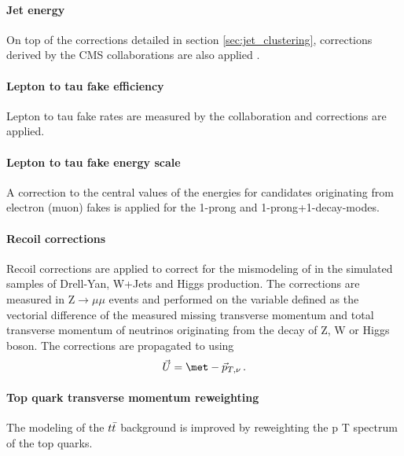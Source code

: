 \paragraph{Jet energy} On top of the corrections detailed in section \ref{sec:jet_clustering}, corrections derived by the CMS collaborations are also applied \cite{collaboration_2011}.

\paragraph{Lepton to tau fake efficiency} Lepton to tau fake rates are measured by the collaboration and corrections are applied.

\paragraph{Lepton to tau fake energy scale} A correction to the central values of the \tauh energies for \tauh candidates originating from electron (muon) fakes is applied for the 1-prong and 1-prong+1-\pizero decay-modes. 

\paragraph{Recoil corrections} Recoil corrections are applied to correct for the mismodeling of \met in the simulated samples of Drell-Yan, W+Jets and Higgs production. The corrections are measured in $\mathrm{Z} \rightarrow \mu\mu$ events and performed on the variable defined as the vectorial difference of the measured missing transverse momentum and total transverse momentum of neutrinos originating from the decay of Z, W or Higgs boson. The corrections are propagated to \met using
\begin{equation}
    \Vec{U} = \met - \Vec{p}_{T,\nu} \mend
\end{equation}

\paragraph{Top quark transverse momentum reweighting} The modeling of the $t\Bar{t}$ background is improved by reweighting the p T spectrum of the top quarks.

